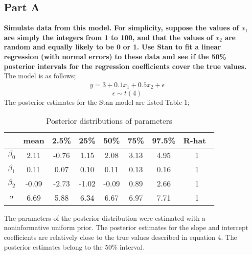 \documentclass{article}
\begin{document}
\subsection{Part A}
\textbf{Simulate data from this model. For simplicity, suppose the values of $x_1$ are simply the integers from 1 to 100, and that the values of $x_2$ are random and equally likely to be 0 or 1. Use Stan to fit a linear regression (with normal errors) to these data and see if the 50\% posterior intervals for the regression coefficients cover the true values.}\\
The model is as follows;
\begin{align}
y = 3 + 0.1 x_1 + 0.5 x_2 + \epsilon
\end{align}
$$\epsilon \sim t(4)$$
The posterior estimates for the Stan model are listed Table 1;
\begin{table}[H]
\caption {Posterior distributions of parameters}
\vspace{2mm}
\centering \begin{tabular}{c c c c c c c c} 
\hline\hline 
\vspace{1mm}
& mean & 2.5\% &  25\% &  50\% &  75\% & 97.5\% & R-hat\ \\ [0.5ex] 
\hline 
$\beta_0$ & 2.11   &    -0.76  &  1.15  & 2.08   &  3.13  &  4.95  &   1 \\ 
$\beta_1$ & 0.11   &    0.07  &  0.10   & 0.11 &   0.13   & 0.16  & 1 \\
$\beta_2$ & -0.09   &    -2.73  &  -1.02  & -0.09  &   0.89  &   2.66  & 1 \\ 
$\sigma$ & 6.69   &    5.88  &  6.34  & 6.67  &   6.97  &   7.71  & 1 \\ [1ex] \hline 
\end{tabular}
\end{table}
The parameters of the posterior distribution were estimated with a noninformative uniform prior. The posterior estimates for the slope and intercept coefficients are relatively close to the true values described in equation 4. The posterior estimates belong to the 50\% interval.
\end{document}
